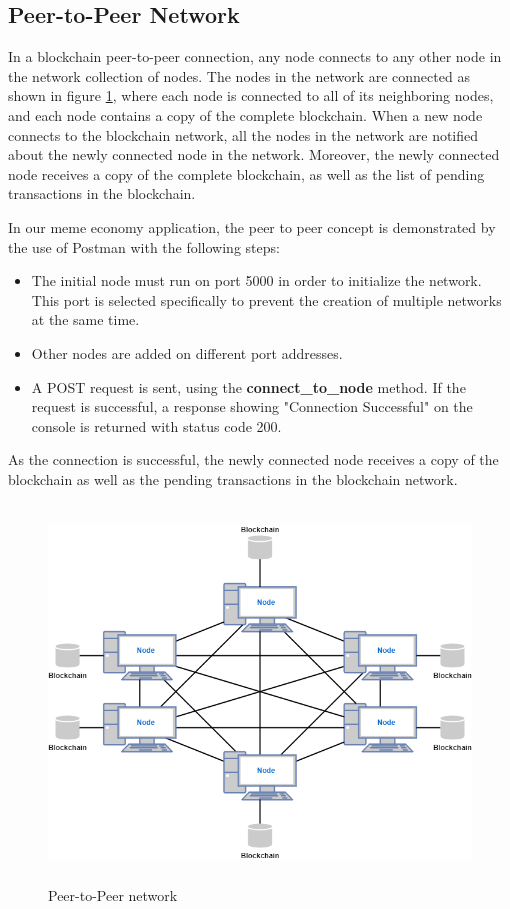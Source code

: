 \documentclass[12pt]{article}
\begin{document}
\subsection{Peer-to-Peer Network} %
In a blockchain peer-to-peer connection, any node connects to any other node in the network collection of nodes. The nodes in the network are connected as shown in figure \ref{fig:P2P}, where each node is connected to all of its neighboring nodes, and each node contains a copy of the complete blockchain. When a new node connects to the blockchain network, all the nodes in the network are notified about the newly connected node in the network. Moreover, the newly connected node receives a copy of the complete blockchain, as well as the list of pending transactions in the blockchain. 

In our meme economy application, the peer to peer concept is demonstrated by the use of Postman with the following steps:
\begin{itemize}
    \item The initial node must run on port 5000 in order to initialize the network. This port is selected specifically to prevent the creation of multiple networks at the same time.
    \item Other nodes are added on different port addresses.
    \item A POST request is sent, using the \textbf{connect\_to\_node} method. If the request is successful, a response showing "Connection Successful" on the console is returned with status code 200.
\end{itemize}

As the connection is successful, the newly connected node receives a copy of the blockchain as well as the pending transactions in the blockchain network.
\begin{figure}[H]
    \centering
    \includegraphics[width=12cm, height=10cm]{../report_MemeEcon/images/p2p.png}
    \caption{Peer-to-Peer network}
    \label{fig:P2P}
\end{figure}
\end{document}
